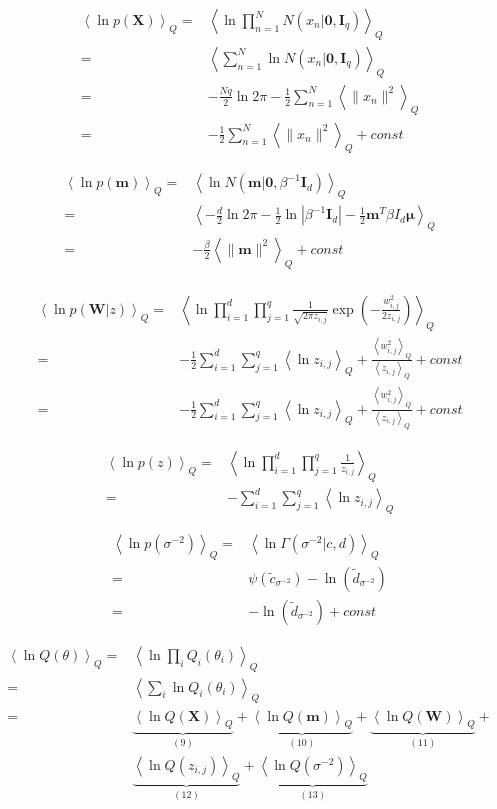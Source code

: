 \documentclass[10pt]{article}
\newcommand{\Angle}[1]{\left \langle #1 \right \rangle}
\newcommand{\Eq}[1]{\Angle{#1}_Q}
\newcommand{\Det}[1]{\left| #1 \right|}
\begin{document}
	\begin{align}
		\Eq{\ln{p(\bm{X})}}=&\Eq{\ln{\prod_{n=1}^{N}{N(x_n|\bm{0},\bm{I}_q)}}} \\
		=&\Eq{\sum_{n=1}^{N}{\ln{N(x_n|\bm{0},\bm{I}_q)}}} \\
		=&-\frac{Nq}{2}\ln{2\pi}-\frac{1}{2}\sum_{n=1}^{N}{\Eq{\|x_n\|^2}} \\
		=&-\frac{1}{2}\sum_{n=1}^{N}{\Eq{\|x_n\|^2}} + const
	\end{align}	
		
	\begin{align}
		\Eq{\ln{p(\bm{m})}}=&\Eq{\ln{N(\bm{m}|\bm{0},\beta^{-1}\bm{I}_d)}}\\
		=&\Eq{-\frac{d}{2}\ln{2\pi}-\frac{1}{2}\ln{\Det{\beta^{-1}\bm{I}_d}}-\frac{1}{2}\bm{m}^T\beta I_d\bm{\mu}} \\
		=&-\frac{\beta}{2}\Eq{\|\bm{m}\|^2}+const \\
	\end{align}	
	
	\begin{align}
		\Eq{\ln{p(\bm{W} \vert z)}}=&\Eq{\ln{\prod_{i=1}^d\prod_{j=1}^q{\frac{1}{\sqrt{2\pi z_{i,j}}}\exp\left(-\frac{w_{i,j}^2}{2z_{i,j}} \right)}}} \\
		=&-\frac{1}{2}\sum_{i=1}^d\sum_{j=1}^q{\Eq{\ln{z_{i,j}}}+\frac{\Eq{w_{i,j}^2}}{\Eq{z_{i,j}}}} + const \\
		=&-\frac{1}{2}\sum_{i=1}^d\sum_{j=1}^q{\Eq{\ln{z_{i,j}}}+\frac{\Eq{w_{i,j}^2}}{\Eq{z_{i,j}}}} + const
	\end{align}		
	
	\begin{align}
		\Eq{\ln{p(z)}}=&\Eq{\ln{\prod_{i=1}^d\prod_{j=1}^q{\frac{1}{z_{i,j}}}}} \\
		=&-\sum_{i=1}^d\sum_{j=1}^q{\Eq{\ln{z_{i,j}}}}
	\end{align}		
	
	\begin{align}
		\Eq{\ln{p(\sigma^{-2})}}=&\Eq{\ln{\Gamma(\sigma^{-2} \vert c,d)}}\\
		=&\psi(\tilde{c}_{\sigma^{-2}})-\ln(\tilde{d}_{\sigma^{-2}}) \\
		=&-\ln(\tilde{d}_{\sigma^{-2}}) + const
	\end{align}

	
	\begin{align}
		\Eq{\ln{Q(\theta)}}=&\Eq{\ln{\prod_i{Q_i(\theta_i)}}} \\
		=&\Eq{\sum_i{\ln{Q_i(\theta_i)}}} \\
		=&\underbrace{\Eq{\ln{Q(\bm{X})}}}_{(9)} + \underbrace{\Eq{\ln{Q(\bm{m})}}}_{(10)} + \underbrace{\Eq{\ln{Q(\bm{W})}}}_{(11)} + \\
		&  \underbrace{\Eq{\ln{Q(z_{i,j})}}}_{(12)} + \underbrace{\Eq{\ln{Q(\sigma^{-2})}}}_{(13)} \nonumber
	\end{align}
\end{document}
